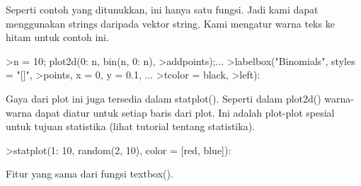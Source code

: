 \documentclass[a4paper,10pt]{article}
\begin{document}
\begin{eulernotebook}
\begin{eulercomment}
\begin{eulercomment}
\begin{eulercomment}
\begin{eulercomment}
\begin{eulercomment}
Seperti contoh yang ditunukkan, ini hanya satu fungsi. Jadi kami dapat
menggunakan strings daripada vektor string. Kami mengatur warna teks
ke hitam untuk contoh ini.
\end{eulercomment}
\begin{eulerprompt}
>n = 10;  plot2d(0: n, bin(n, 0: n), >addpoints);...
>labelbox("Binomials", styles = "[]", >points, x = 0, y = 0.1, ...
>tcolor = black, >left):
\end{eulerprompt}
\begin{eulercomment}
Gaya dari plot ini juga tersedia dalam statplot(). Seperti dalam
plot2d() warna-warna dapat diatur untuk setiap baris dari plot. Ini
adalah plot-plot spesial untuk tujuan statistika (lihat tutorial
tentang statistika).
\end{eulercomment}
\begin{eulerprompt}
>statplot(1: 10, random(2, 10), color = [red, blue]):
\end{eulerprompt}
\begin{eulercomment}
Fitur yang sama dari fungsi textbox().


\end{eulercomment}
\end{eulercomment}
\end{eulercomment}
\end{eulercomment}
\end{eulercomment}
\end{eulernotebook}
\end{document}
